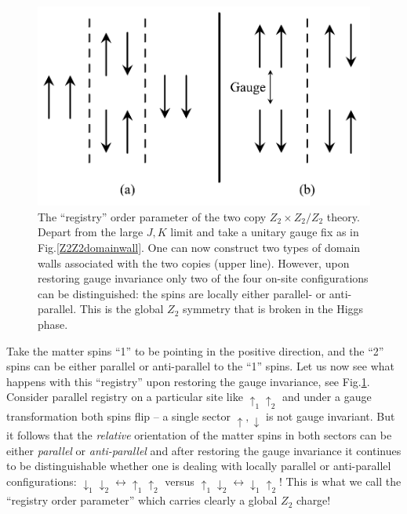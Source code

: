 \begin{figure}[!h]
	\centering
	\includegraphics[scale=.4]{figures/chapter2/Z2xZ2Z2domainWall.pdf}
	\caption{The ``registry'' order parameter of the two copy $Z_2 \times Z_2/Z_2$ theory. Depart from the large $J,K$ limit and take a unitary gauge fix as in Fig.\ref{Z2Z2domainwall}. One can now construct two types of domain walls associated with the two copies (upper line). However, upon restoring gauge invariance only two of the four on-site configurations can be distinguished: the spins are locally either parallel- or anti-parallel.  This is the global $Z_2$ symmetry that is broken in the Higgs phase.} 
	\label{twocopyregistry}
\end{figure} 

Take the matter spins ``1'' to be pointing in the positive direction, and the ``2'' spins can be either parallel or anti-parallel to the ``1'' spins. Let us now see what happens with this ``registry'' upon restoring the gauge invariance, see Fig.\ref{twocopyregistry}. Consider parallel registry on a particular site like  $ \uparrow_{1} \uparrow_{2}$ and  under a gauge transformation both spins flip -- a single sector $\uparrow, \downarrow$ is not  gauge invariant. But it follows that the {\em relative} orientation of the matter spins in both sectors can be either {\em parallel} or {\em anti-parallel} and after restoring the gauge invariance it continues to be distinguishable whether one is dealing with locally parallel or anti-parallel configurations:  $ \downarrow_{1} \downarrow_{2} \leftrightarrow \uparrow_{1} \uparrow_{2}$ versus $ \uparrow_{1} \downarrow_{2} \leftrightarrow \downarrow_{1} \uparrow_{2}$! This is what we call the ``registry order parameter'' which carries clearly a global $Z_2$ charge!

